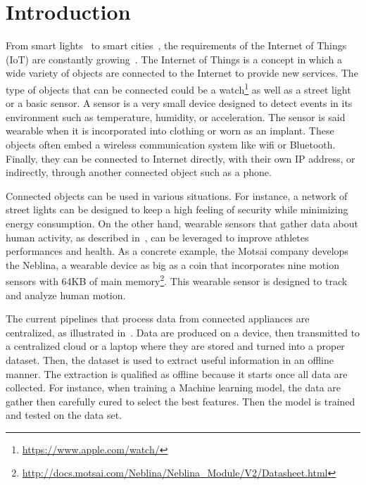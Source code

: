 \section{Introduction}
\label{sec:introduction}
From smart lights~\cite{smart-lamp-2011} to smart
cities~\cite{smart-cities}, the requirements of
the Internet of Things (IoT) are constantly
growing~\cite{iot-platform}. 
The Internet of
Things is a concept in which a wide variety
of objects are connected to the Internet to
provide new services.  The
type of objects that can be connected could be a
watch\footnote{\url{https://www.apple.com/watch/}}
as well as a street light~\cite{smart-lamp-2011}
or a basic sensor. A sensor is a very small device
designed to detect events in its environment such
as temperature, humidity, or acceleration.  The
sensor is said wearable when it is incorporated
into clothing or worn as an implant. These objects often
embed a wireless communication system like wifi
or Bluetooth.  Finally, they can be
connected to Internet directly, with their own IP
address, or indirectly, through another connected
object such as a phone.

Connected objects can be used in various
situations.  For instance, a network of street
lights can be designed to keep a high feeling of
security while minimizing energy consumption.  On
the other hand, wearable sensors that gather data
about human activity, as described
in~\cite{recofit}, can be leveraged to improve
athletes performances and health. 
As a concrete example, the Motsai company develops
the Neblina, a wearable device as big as a coin
that incorporates nine motion sensors with 64KB
of main
memory\footnote{\url{http://docs.motsai.com/Neblina/Neblina_Module/V2/Datasheet.html}}.
This wearable sensor is designed to track and
analyze human motion.

The current pipelines that process data from
connected appliances are centralized, as
illustrated in~\cite{recofit}.  Data are produced
on a device, then transmitted to a centralized
cloud or a laptop where they are stored and turned
into a proper dataset. Then, the dataset is used
to extract useful information in an offline
manner.  The extraction is qualified as offline
because it starts once all data are collected. For
instance, when training a Machine learning model,
the data are gather then carefully cured to select
the best features. Then the model is trained and
tested on the data set.

